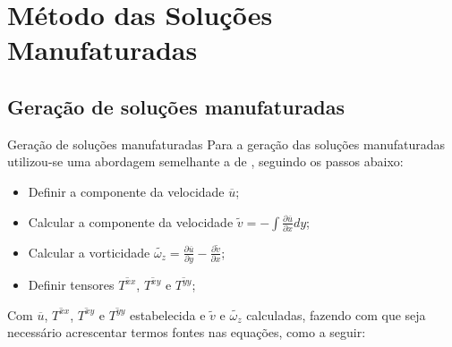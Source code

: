 \section{Método das Soluções Manufaturadas}

\subsection{Geração de soluções manufaturadas}

\begin{frame}{Geração de soluções manufaturadas}
Para a geração das soluções manufaturadas utilizou-se uma abordagem semelhante a de \cite{shih1989effects}, seguindo os passos abaixo:
\begin{itemize}
    \item Definir a componente da velocidade $\overline{u}$;
    \item Calcular a componente da velocidade $\widetilde{v} = - \int \frac{\partial \overline{u}}{\partial x}dy$;
    \item Calcular a vorticidade $\widetilde{\omega_z}=\frac{\partial \overline{u}}{\partial y}-\frac{\partial \widetilde{v}}{\partial x}$;
     \item Definir tensores $\overline{T^{xx}}$, $\overline{T^{xy}}$ e $\overline{T^{yy}}$;
\end{itemize}

Com $\overline{u}$, $\overline{T^{xx}}$, $\overline{T^{xy}}$ e $\overline{T^{yy}}$ estabelecida e $\widetilde{v}$ e $\widetilde{\omega_z}$ calculadas, fazendo com que seja necessário acrescentar termos fontes nas equações, como a seguir:
\end{frame}

